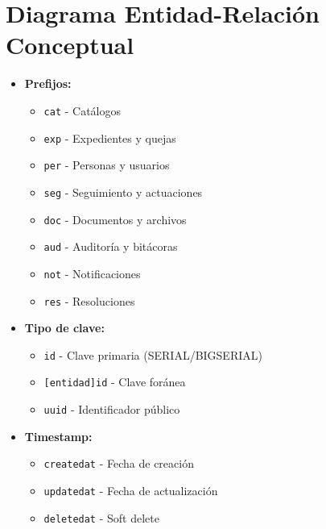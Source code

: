 \documentclass[12pt, a4paper]{article}
\newcommand{\ud}{\textunderscore}
\begin{document}
\newpage

\tableofcontents
\newpage

\section{Diagrama Entidad-Relación Conceptual}
\label{sec:der}

\begin{tcolorbox}[title=Convenciones de Nomenclatura, colback=gray!5!white]
    \begin{itemize}[leftmargin=*]
        \item \textbf{Prefijos:} 
            \begin{itemize}
                \item \texttt{cat\ud} - Catálogos
                \item \texttt{exp\ud} - Expedientes y quejas
                \item \texttt{per\ud} - Personas y usuarios
                \item \texttt{seg\ud} - Seguimiento y actuaciones
                \item \texttt{doc\ud} - Documentos y archivos
                \item \texttt{aud\ud} - Auditoría y bitácoras
                \item \texttt{not\ud} - Notificaciones
                \item \texttt{res\ud} - Resoluciones
            \end{itemize}
        \item \textbf{Tipo de clave:}
            \begin{itemize}
                \item \texttt{id} - Clave primaria (SERIAL/BIGSERIAL)
                \item \texttt{[entidad]\ud id} - Clave foránea
                \item \texttt{uuid} - Identificador público
            \end{itemize}
        \item \textbf{Timestamp:}
            \begin{itemize}
                \item \texttt{created\ud at} - Fecha de creación
                \item \texttt{updated\ud at} - Fecha de actualización
                \item \texttt{deleted\ud at} - Soft delete
            \end{itemize}
    \end{itemize}
\end{tcolorbox}
\end{document}

